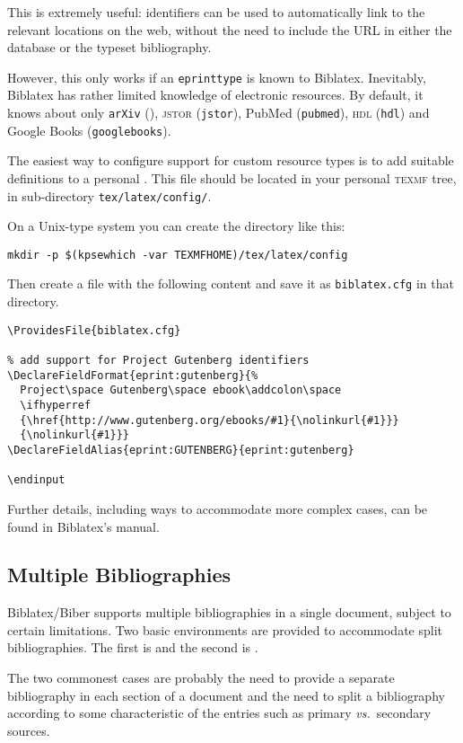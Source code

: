 This is extremely useful: identifiers can be used to automatically link to the relevant locations on the web, without the need to include the URL in either the database or the typeset bibliography.

However, this only works if an \texttt{eprinttype} is known to Biblatex.
Inevitably, Biblatex has rather limited knowledge of electronic resources.
By default, it knows about only \texttt{arXiv} (), \textsc{jstor} (\texttt{jstor}), PubMed (\texttt{pubmed}), \textsc{hdl} (\texttt{hdl}) and Google Books (\texttt{googlebooks}).

The easiest way to configure support for custom resource types is to add suitable definitions to a personal .
This file should be located in your personal \textsc{texmf} tree, in sub-directory \texttt{tex/latex/config/}.

On a Unix-type system you can create the directory like this:
\begin{verbatim}
mkdir -p $(kpsewhich -var TEXMFHOME)/tex/latex/config
\end{verbatim}
Then create a file with the following content and save it as \texttt{biblatex.cfg} in that directory.
\begin{verbatim}
\ProvidesFile{biblatex.cfg}

% add support for Project Gutenberg identifiers
\DeclareFieldFormat{eprint:gutenberg}{%
  Project\space Gutenberg\space ebook\addcolon\space
  \ifhyperref
  {\href{http://www.gutenberg.org/ebooks/#1}{\nolinkurl{#1}}}
  {\nolinkurl{#1}}}
\DeclareFieldAlias{eprint:GUTENBERG}{eprint:gutenberg}

\endinput
\end{verbatim}
Further details, including ways to accommodate more complex cases, can be found in Biblatex's manual.


\subsection{Multiple Bibliographies}\label{subsec:multibib}

Biblatex/Biber supports multiple bibliographies in a single document, subject to certain limitations.
Two basic environments are provided to accommodate split bibliographies.
The first is  and the second is .

The two commonest cases are probably the need to provide a separate bibliography in each section of a document and the need to split a bibliography according to some characteristic of the entries such as primary \emph{vs.}\ secondary sources.

